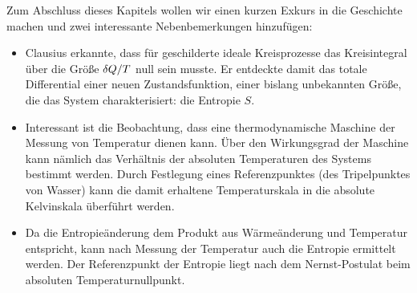 Zum Abschluss dieses Kapitels wollen wir einen kurzen Exkurs in die Geschichte machen und zwei interessante Nebenbemerkungen hinzufügen: 

\begin{itemize}
    \item Clausius erkannte, dass für geschilderte ideale Kreisprozesse das Kreisintegral über die Größe $\mathop{}\!\delta Q/T$ null sein musste. Er entdeckte damit das totale Differential einer neuen Zustandsfunktion, einer bislang unbekannten Größe, die das System charakterisiert: die Entropie $S$.  
    \item Interessant ist die Beobachtung, dass eine thermodynamische Maschine der Messung von Temperatur dienen kann. 
    Über den Wirkungsgrad der Maschine kann nämlich das Verhältnis der absoluten Temperaturen des Systems bestimmt werden. Durch Festlegung eines Referenzpunktes (des Tripelpunktes von Wasser) kann die damit erhaltene Temperaturskala in die absolute Kelvinskala überführt werden.
    \item Da die Entropieänderung dem Produkt aus Wärmeänderung und Temperatur entspricht, kann nach Messung der Temperatur auch die Entropie ermittelt werden. Der Referenzpunkt der Entropie liegt nach dem Nernst-Postulat beim absoluten Temperaturnullpunkt.
\end{itemize}







